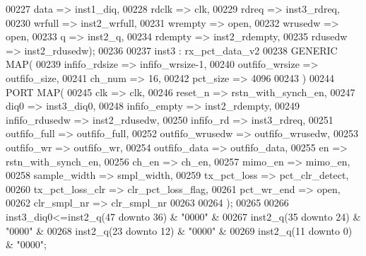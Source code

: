 \begin{DoxyCode}
00227             data                => inst1_diq,
00228             rdclk           => clk,
00229             rdreq           => inst3_rdreq,
00230             wrfull          => inst2_wrfull,
00231             wrempty         => \textcolor{keywordflow}{open},
00232             wrusedw         => \textcolor{keywordflow}{open}, 
00233             q                   => inst2_q,
00234             rdempty             => inst2_rdempty,
00235             rdusedw             => inst2_rdusedw\textcolor{vhdlchar}{)};
00236  
00237 inst3 : rx_pct_data_v2
00238 \textcolor{keywordflow}{GENERIC} \textcolor{keywordflow}{MAP}(
00239             infifo_rdsize       => infifo_wrsize-\textcolor{vhdllogic}{1},
00240             outfifo_wrsize  => outfifo_size,
00241             ch_num              => \textcolor{vhdllogic}{16},
00242             pct_size            => \textcolor{vhdllogic}{4096}
00243             \textcolor{vhdlchar}{)}
00244 \textcolor{keywordflow}{PORT} \textcolor{keywordflow}{MAP}(
00245             clk                     => clk,
00246             reset_n                 => rstn_with_synch_en,
00247             diq0                    => inst3_diq0,
00248             infifo_empty        => inst2_rdempty,
00249             infifo_rdusedw  => inst2_rdusedw,
00250             infifo_rd           => inst3_rdreq,
00251             outfifo_full        => outfifo_full,
00252             outfifo_wrusedw     => outfifo_wrusedw,
00253             outfifo_wr          => outfifo_wr,
00254             outfifo_data        => outfifo_data,
00255             en                  => rstn_with_synch_en,
00256             ch_en               => ch_en,
00257             mimo_en                 => mimo_en,
00258             sample_width        => smpl_width,
00259             tx_pct_loss         => pct_clr_detect,
00260             tx_pct_loss_clr     => clr_pct_loss_flag,
00261             pct_wr_end          => \textcolor{keywordflow}{open},
00262             clr_smpl_nr         => clr_smpl_nr
00263 
00264             \textcolor{vhdlchar}{)};
00265  
00266 inst3\_diq0<=inst2\_q(\textcolor{vhdllogic}{47} \textcolor{keywordflow}{downto} \textcolor{vhdllogic}{36}) & "\textcolor{vhdllogic}{0000}" & 
00267                 inst2\_q(\textcolor{vhdllogic}{35} \textcolor{keywordflow}{downto} \textcolor{vhdllogic}{24}) & "\textcolor{vhdllogic}{0000}" & 
00268                 inst2\_q(\textcolor{vhdllogic}{23} \textcolor{keywordflow}{downto} \textcolor{vhdllogic}{12}) & "\textcolor{vhdllogic}{0000}" & 
00269                 inst2\_q(\textcolor{vhdllogic}{11} \textcolor{keywordflow}{downto} \textcolor{vhdllogic}{0})  & "\textcolor{vhdllogic}{0000}";

\end{DoxyCode}
